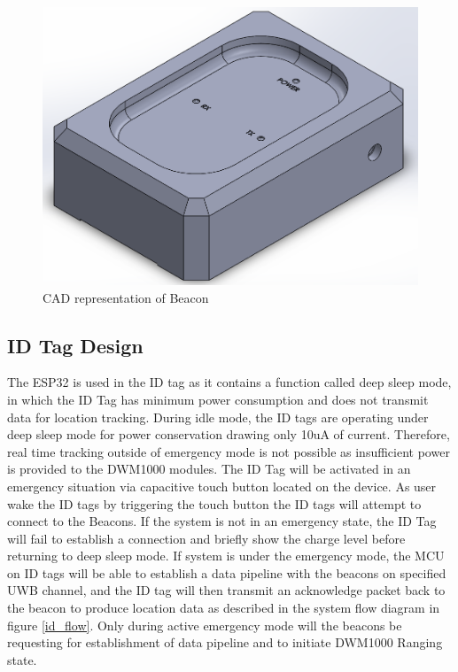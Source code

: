 \bigskip
\begin{figure}[H]
\centering
    \includegraphics[width=\linewidth]{./images/Beacon.png}
    \caption{CAD representation of Beacon}
    \label{Bcn_CAD}
\end{figure}



\pagebreak
\subsection{ID Tag Design}
The ESP32 is used in the ID tag as it contains a function called deep sleep mode, in which the ID Tag has minimum power consumption and does not transmit data for location tracking. During idle mode, the ID tags are operating under deep sleep mode for power conservation drawing only 10uA of current. Therefore, real time tracking outside of emergency mode is not possible as insufficient power is provided to the DWM1000 modules. The ID Tag will be activated in an emergency situation via capacitive touch button located on the device. As user wake the ID tags by triggering the touch button the ID tags will attempt to connect to the Beacons. If the system is not in an emergency state, the ID Tag will fail to establish a connection and briefly show the charge level before returning to deep sleep mode. If system is under the emergency mode, the MCU on ID tags will be able to establish a data pipeline with the beacons on specified UWB channel, and the ID tag will then transmit an acknowledge packet back to the beacon to produce location data as described in the system flow diagram in figure \ref{id_flow}. Only during active emergency mode will the beacons be requesting for establishment of data pipeline and to initiate DWM1000 Ranging state.

